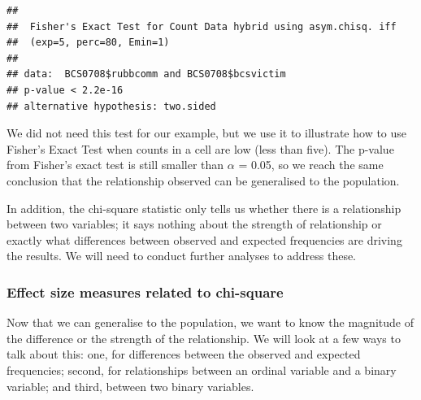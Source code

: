 \documentclass[
]{book}
\newenvironment{Shaded}{\begin{snugshade}}{\end{snugshade}}
\newcommand{\AttributeTok}[1]{\textcolor[rgb]{0.77,0.63,0.00}{#1}}
\newcommand{\CommentTok}[1]{\textcolor[rgb]{0.56,0.35,0.01}{\textit{#1}}}
\newcommand{\ConstantTok}[1]{\textcolor[rgb]{0.00,0.00,0.00}{#1}}
\newcommand{\FloatTok}[1]{\textcolor[rgb]{0.00,0.00,0.81}{#1}}
\newcommand{\FunctionTok}[1]{\textcolor[rgb]{0.00,0.00,0.00}{#1}}
\newcommand{\NormalTok}[1]{#1}
\newcommand{\SpecialCharTok}[1]{\textcolor[rgb]{0.00,0.00,0.00}{#1}}
\begin{document}
\begin{Shaded}
\end{Shaded}

\begin{Shaded}
\end{Shaded}

\begin{verbatim}
## 
##  Fisher's Exact Test for Count Data hybrid using asym.chisq. iff
##  (exp=5, perc=80, Emin=1)
## 
## data:  BCS0708$rubbcomm and BCS0708$bcsvictim
## p-value < 2.2e-16
## alternative hypothesis: two.sided
\end{verbatim}

We did not need this test for our example, but we use it to illustrate how to use Fisher's Exact Test when counts in a cell are low (less than five). The p-value from Fisher's exact test is still smaller than \(\alpha\) = 0.05, so we reach the same conclusion that the relationship observed can be generalised to the population.

In addition, the chi-square statistic only tells us whether there is a relationship between two variables; it says nothing about the strength of relationship or exactly what differences between observed and expected frequencies are driving the results. We will need to conduct further analyses to address these.

\hypertarget{effect-size-measures-related-to-chi-square}{%
\subsubsection{Effect size measures related to chi-square}\label{effect-size-measures-related-to-chi-square}}

Now that we can generalise to the population, we want to know the magnitude of the difference or the strength of the relationship. We will look at a few ways to talk about this: one, for differences between the observed and expected frequencies; second, for relationships between an ordinal variable and a binary variable; and third, between two binary variables.
\end{document}
